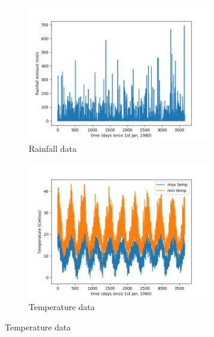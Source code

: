 \documentclass{article}
\begin{document}
\begin{figure}[h!]
	\caption{Plot of raw data}
	\label{ref:raw_data}
	\begin{subfigure}{\textwidth}
		\includegraphics[width=\linewidth, height=6cm]{figures/raw_data_rain.png} 
		\caption{Rainfall data}
		\label{fig:raw_data_rain}
	\end{subfigure}
	\begin{subfigure}{\textwidth}
		\includegraphics[width=\linewidth, height=6cm]{figures/raw_data_temp.png}
		\caption{Temperature data}	
		\label{fig:raw_data_temp}
	\end{subfigure}
\end{figure}

\newpage
\end{document}

